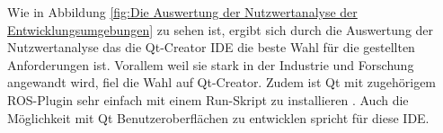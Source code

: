Wie in Abbildung \ref{fig:Die Auswertung der Nutzwertanalyse der Entwicklungsumgebungen} zu sehen ist, ergibt sich durch die Auswertung der Nutzwertanalyse das die Qt-Creator IDE die beste Wahl f{\"u}r die gestellten Anforderungen ist. Vorallem weil sie stark in der Industrie und Forschung angewandt wird, fiel die Wahl auf Qt-Creator. Zudem ist Qt mit zugeh{\"o}rigem ROS-Plugin sehr einfach mit einem Run-Skript zu installieren \cite{rosinstall}. Auch die M{\"o}glichkeit mit Qt Benutzeroberfl{\"a}chen zu entwicklen spricht f\"ur diese IDE.






